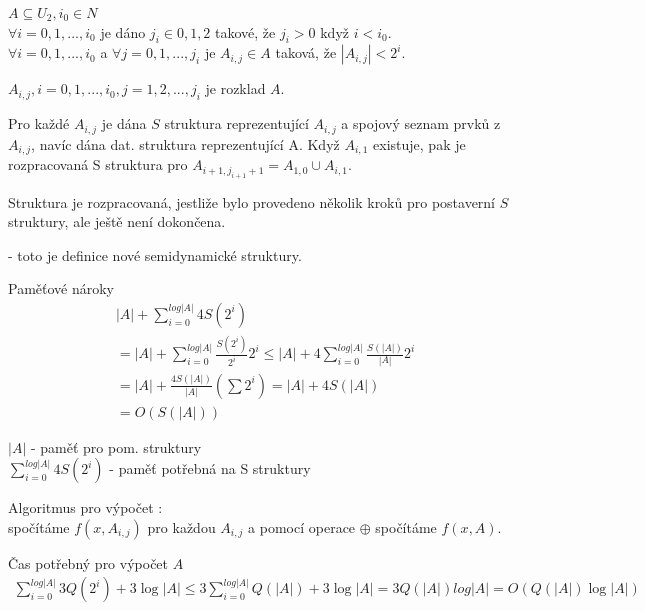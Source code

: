 

$A \subseteq U_2, i_0 \in N$ \\
$\forall i = 0,1,...,i_0$ je dáno $j_i \in {0,1,2}$ takové, že $j_i > 0$
když $i < i_0$. \\
$\forall i = 0,1,...,i_0$ a $\forall j = 0,1,...,j_i$ je $A_{i,j} \in A$
taková, že $|A_{i,j}| < 2^i$.

\begin{defn}
${ A_{i,j}, i=0,1,...,i_0, j=1,2,...,j_i }$ je rozklad $A$.
\end{defn}

Pro každé $A_{i,j}$ je dána $S$ struktura reprezentující $A_{i,j}$ a spojový
seznam prvků z $A_{i,j}$, navíc dána dat. struktura reprezentující A.
Když $A_{i,1}$ existuje, pak je rozpracovaná S struktura pro
$A_{i+1,j_{i+1}+1} = A_{1,0} \cup A_{i,1}$.

\begin{pozn}
Struktura je rozpracovaná, jestliže bylo provedeno několik kroků
pro postaverní $S$ struktury, ale ještě není dokončena.
\end{pozn}

- toto je definice nové semidynamické struktury.

Paměťové nároky
\begin{equation}
\begin{split}
& |A| + \sum_{i=0}^{log |A|} 4S(2^i) \\
& = |A| + \sum_{i=0}^{log |A|} \frac{S(2^i)}{2^i}2^i \leq 
|A| + 4 \sum_{i=0}^{log |A|} \frac{S(|A|)}{|A|}2^i \\
& = |A| + \frac{4S(|A|)}{|A|} (\sum 2^i) = |A| + 4S(|A|) \\
& = O(S(|A|))
\end{split}
\end{equation}

\begin{pozn}
$|A|$ - paměť pro pom. struktury  \\
$\sum_{i=0}^{log |A|} 4S(2^i)$ - paměť potřebná na S struktury
\end{pozn}

Algoritmus pro výpočet : \\
spočítáme $f(x,A_{i,j})$ pro každou $A_{i,j}$ a pomocí operace $\oplus$
spočítáme $f(x,A)$. 

Čas potřebný pro výpočet $A$
\begin{multline}
\sum_{i=0}^{log |A|} 3Q(2^i) + 3\log |A| \leq 
3\sum_{i=0}^{log |A|} Q(|A|) + 3\log |A| = 
3Q(|A|)log |A| = O(Q(|A|)\log |A|)
\end{multline}

